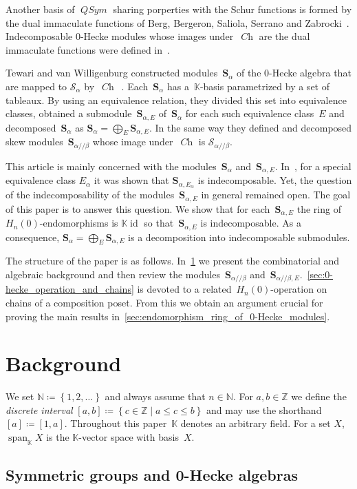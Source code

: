 \documentclass[ALCO,ThmDefs,Unicode,epreuves]{cedram}
\newcommand{\bs}[1]{\boldsymbol{#1} }
\newcommand{\mc}[1]{\mathcal{#1} }
\newcommand{\N}{\mathbb N}
\newcommand{\Z}{\mathbb Z}
\newcommand{\K}{\mathbb K}
\newcommand{\QSym}{\operatorname{\mathit{QSym}}}
\newcommand{\Ch}{\operatorname{\mathit{Ch}}}
\DeclareMathOperator{\id}{id}
\newcommand{\set}[1]{\left\{ #1 \right\}}
\newcommand{\spa}{\operatorname{span}}
\newcommand{\He}{H_n(0)}
\newcommand{\ab}{{\alpha / \! \! / \beta}}
\newcommand{\sa}{\bs S_{\alpha}}
\newcommand{\sab}{\bs S_{\ab}}
\newcommand{\se}{\bs S_{\alpha,E}}
\newcommand{\sse}{\bs S_{\ab,E}}
\begin{document}
Another basis of $\QSym$ sharing porperties with the Schur functions is formed by the dual immaculate functions of Berg, Bergeron, Saliola, Serrano and Zabrocki~\cite{Berg2014}.
Indecomposable 0-Hecke modules whose images under~$\Ch$ are the dual immaculate functions were defined in~\cite{Berg2015}.

Tewari and van Willigenburg constructed modules~$\sa$ of the 0-Hecke algebra that are mapped to $\mc S_\alpha$ by~$\Ch$~\cite{Tewari2015}. Each~$\sa$ has a~$\K$-basis parametrized by a set of tableaux. By using an equivalence relation, they divided this set into equivalence classes, obtained a submodule~$\se$ of~$\sa$ for each such equivalence class~$E$ and decomposed~$\sa$ as $\sa = \bigoplus_E \se$.
In the same way they defined and decomposed skew modules~$\sab$ whose image under~$\Ch$ is $\mc S_\ab$.

This article is mainly concerned with the modules~$\sa$ and~$\se$. 
In~\cite{Tewari2015}, for a special equivalence class $E_\alpha$ it was shown
that $\bs S_{\alpha, E_\alpha}$ is indecomposable. Yet, the question of the indecomposability of the modules~$\se$ in general remained open.
The goal of this paper is to answer this question. We show that for each~$\se$ the ring of~$\He$-endomorphisms is $\K\id$ so that~$\se$ is indecomposable. As a consequence, $\sa = \bigoplus_E \se$ is a decomposition into indecomposable submodules.

The structure of the paper is as follows. In~\cref{sec:preliminaries} we present the combinatorial and algebraic background and then review the modules~$\sab$ and~$\sse$.~\cref{sec:0-hecke_operation_and_chains} is devoted to a related~$\He$-operation on chains of a composition poset.
From this we obtain an argument crucial for proving the main results in~\cref{sec:endomorphism_ring_of_0-Hecke_modules}.


\section{Background}
\label{sec:preliminaries}

We set $\N \coloneqq \set{1,2,\dots}$ and always assume that $n\in \N$. For $a,b\in \Z$ we define the \emph{discrete interval} $[a,b]\coloneqq \set{c\in \Z\mid a\leq c \leq b}$ and may use the shorthand $[a] \coloneqq [1,a]$. 
Throughout this paper~$\K$ denotes an arbitrary field. For a set $X$, $\spa_\K X$ is the $\K$-vector space with basis~$X$.

\subsection{Symmetric groups and 0-Hecke algebras}
\end{document}
